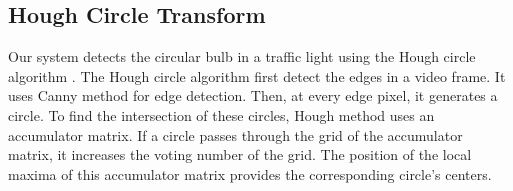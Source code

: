 \subsection{Hough Circle Transform}
Our system detects the circular bulb in a traffic light using the Hough circle algorithm \cite{houghcir_alg}.
The Hough circle algorithm first detect the edges in a video frame.
It uses Canny method  for edge detection.
Then, at every edge pixel, it generates a circle.
To find the intersection of these circles, Hough method uses an accumulator matrix.
If a circle passes through the grid of the accumulator matrix, it increases the voting number of the grid.
The position of the local maxima of this accumulator matrix provides the corresponding circle's centers.







